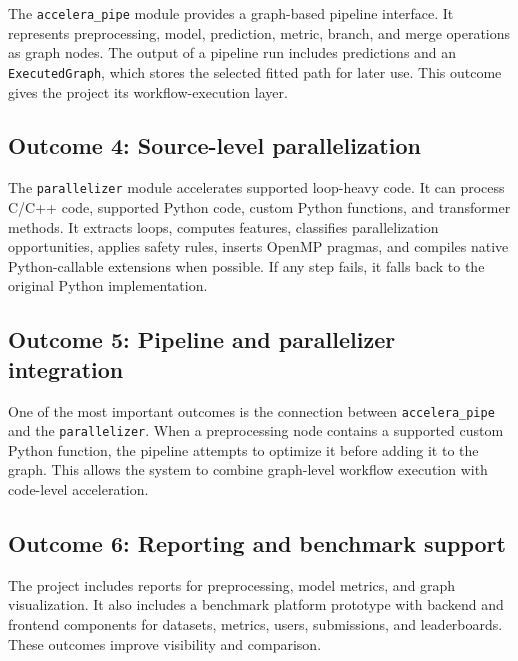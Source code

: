 \documentclass[12pt,a4paper]{report}
\begin{document}
The \texttt{accelera\_pipe} module provides a graph-based pipeline interface.
It represents preprocessing, model, prediction, metric, branch, and merge
operations as graph nodes. The output of a pipeline run includes predictions and
an \texttt{ExecutedGraph}, which stores the selected fitted path for later use.
This outcome gives the project its workflow-execution layer.

\subsection*{Outcome 4: Source-level parallelization}

The \texttt{parallelizer} module accelerates supported loop-heavy code. It can
process C/C++ code, supported Python code, custom Python functions, and
transformer methods. It extracts loops, computes features, classifies
parallelization opportunities, applies safety rules, inserts OpenMP pragmas, and
compiles native Python-callable extensions when possible. If any step fails, it
falls back to the original Python implementation.

\subsection*{Outcome 5: Pipeline and parallelizer integration}

One of the most important outcomes is the connection between
\texttt{accelera\_pipe} and the \texttt{parallelizer}. When a preprocessing node
contains a supported custom Python function, the pipeline attempts to optimize
it before adding it to the graph. This allows the system to combine graph-level
workflow execution with code-level acceleration.

\subsection*{Outcome 6: Reporting and benchmark support}

The project includes reports for preprocessing, model metrics, and graph
visualization. It also includes a benchmark platform prototype with backend and
frontend components for datasets, metrics, users, submissions, and leaderboards.
These outcomes improve visibility and comparison.
\end{document}
